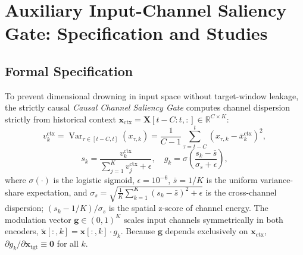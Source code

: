 \section{Auxiliary Input-Channel Saliency Gate: Specification and Studies}
\label{sup:gating}

\subsection{Formal Specification}
To prevent dimensional drowning in input space without target-window leakage, the strictly causal \textit{Causal Channel Saliency Gate} computes channel dispersion strictly from historical context $\mathbf{x}_{\text{ctx}} = \mathbf{X}[t-C:t, :] \in \mathbb{R}^{C \times K}$:
\begin{equation}
    v_k^{\text{ctx}} = \operatorname{Var}_{\tau \in [t-C, t]}(x_{\tau, k}) = \frac{1}{C-1} \sum_{\tau=t-C}^t \left(x_{\tau, k} - \bar{x}_k^{\text{ctx}}\right)^2,
\end{equation}
\begin{equation}
    s_k = \frac{v_k^{\text{ctx}}}{\sum_{j=1}^K v_j^{\text{ctx}} + \epsilon}, \quad g_k = \sigma\left(\frac{s_k - \bar{s}}{\sigma_s + \epsilon}\right),
\end{equation}
where $\sigma(\cdot)$ is the logistic sigmoid, $\epsilon = 10^{-6}$, $\bar{s} = 1/K$ is the uniform variance-share expectation, and $\sigma_s = \sqrt{\frac{1}{K}\sum_{k=1}^K (s_k - \bar{s})^2 + \epsilon}$ is the cross-channel dispersion; $(s_k - 1/K)/\sigma_s$ is the spatial z-score of channel energy. The modulation vector $\mathbf{g} \in (0,1)^K$ scales input channels symmetrically in both encoders, $\tilde{\mathbf{x}}[:, k] = \mathbf{x}[:, k] \cdot g_k$. Because $\mathbf{g}$ depends exclusively on $\mathbf{x}_{\text{ctx}}$, $\partial g_k / \partial \mathbf{x}_{\text{tgt}} \equiv \mathbf{0}$ for all $k$.


